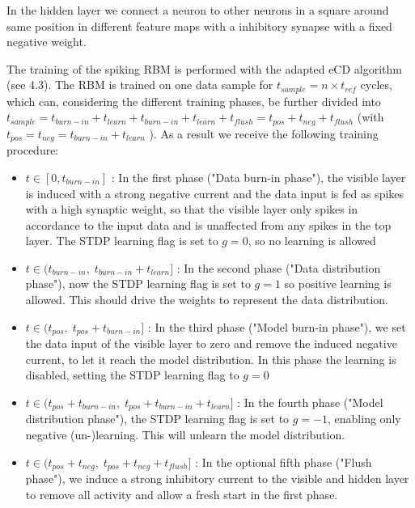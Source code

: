 In the hidden layer we connect a neuron to other neurons in a square around same position in different feature maps with a inhibitory synapse with a fixed negative weight.

The training of the spiking RBM is performed with the adapted eCD algorithm (see 4.3).
The RBM is trained on one data sample for $t_{sample} = n \times t_{ref}$ cycles, which can, considering the different training phases, be further divided into $t_{sample} = t_{burn-in} + t_{learn} + t_{burn-in} + t_{learn} + t_{flush} = t_{pos} + t_{neg} + t_{flush}$ (with $t_{pos} = t_{neg} = t_{burn-in} + t_{learn}$ ). 
As a result we receive the following training procedure:
\begin{itemize}

\item $t \in [0, t_{burn-in}]$ : In the first phase ("Data burn-in phase"), the visible layer is induced with a strong negative current and the data input is fed as spikes with a high synaptic weight, so that the visible layer only spikes in accordance to the input data and is unaffected from any spikes in the top layer.
The STDP learning flag is set to $g=0$, so no learning is allowed

\item $t \in (t_{burn-in} , \; t_{burn-in} + t_{learn}]$ : In the second phase ("Data distribution phase"), now the STDP learning flag is set to $g=1$ so positive learning is allowed.
This should drive the weights to represent the data distribution.

\item $t \in (t_{pos}, \;  t_{pos} + t_{burn-in}]$ : In the third phase ("Model burn-in phase"), we set the data input of the visible layer to zero and remove the induced negative current, to let it reach the model distribution.
In this phase the learning is disabled, setting the STDP learning flag to $g=0$

\item $t \in (t_{pos} + t_{burn-in}, \;  t_{pos} + t_{burn-in} + t_{learn}]$ : In the fourth phase ("Model distribution phase"), the STDP learning flag is set to $g=-1$, enabling only negative (un-)learning.
This will unlearn the model distribution.

\item $t \in (t_{pos} + t_{neg}, \;  t_{pos} + t_{neg} + t_{flush}]$ : In the optional fifth phase ("Flush phase"), we induce a strong inhibitory current to the visible and hidden layer to remove all activity and allow a fresh start in the first phase.

\end{itemize}


